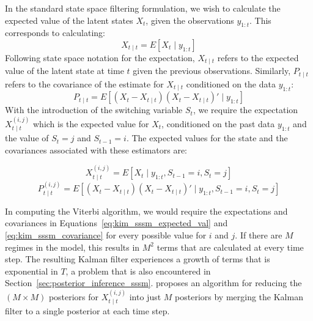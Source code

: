 In the standard state space filtering formulation, we wish to calculate the expected value of the latent states $X_t$, given the observations $y_{1:t}$. This corresponds to calculating:
\begin{equation}\label{eq:kim_ssm_expected_val}
  X_{t \mid t} = E[X_t \mid y_{1:t}]
\end{equation}
Following state space notation for the expectation, $X_{t \mid t}$ refers to the expected value of the latent state at time $t$ given the previous observations. Similarly, $P_{t \mid t}$ refers to the covariance of the estimate for $X_{t \mid t}$ conditioned on the data $y_{1:t}$:
\begin{equation}\label{eq:kim_ssm_covariance}
  P_{t \mid t} = E[(X_t - X_{t \mid t})(X_t - X_{t \mid t})' \mid y_{1:t}]
\end{equation}
With the introduction of the switching variable $S_t$, we require the expectation $X_{t \mid t}^{(i,j)}$ which is the expected value for $X_t$, conditioned on the past data $y_{1:t}$ and the value of $S_t = j$ and $S_{t-1} = i$. The expected values for the state and the covariances associated with these estimators are:

\begin{equation}\label{eq:kim_sssm_expected_val}
  X_{t \mid t}^{(i,j)} = E[X_t \mid y_{1:t}, S_{t-1} = i, S_t = j]
\end{equation}
\begin{equation}\label{eq:kim_sssm_covariance}
  P_{t \mid t}^{(i,j)} = E[(X_t - X_{t \mid t})(X_t - X_{t \mid t})' \mid y_{1:t}, S_{t-1} = i, S_t = j]
\end{equation}

In computing the Viterbi algorithm, we would require the expectations and covariances in Equations~\ref{eq:kim_sssm_expected_val} and \ref{eq:kim_sssm_covariance} for every possible value for $i$ and $j$. If there are $M$ regimes in the model, this results in $M^2$ terms that are calculated at every time step. The resulting Kalman filter experiences a growth of terms that is exponential in $T$, a problem that is also encountered in Section~\ref{sec:posterior_inference_sssm}. \cite{kim1994dynamic} proposes an algorithm for reducing the $(M \times M)$ posteriors for $X_{t \mid t}^{(i,j)}$ into just $M$ posteriors by merging the Kalman filter to a single posterior at each time step.

